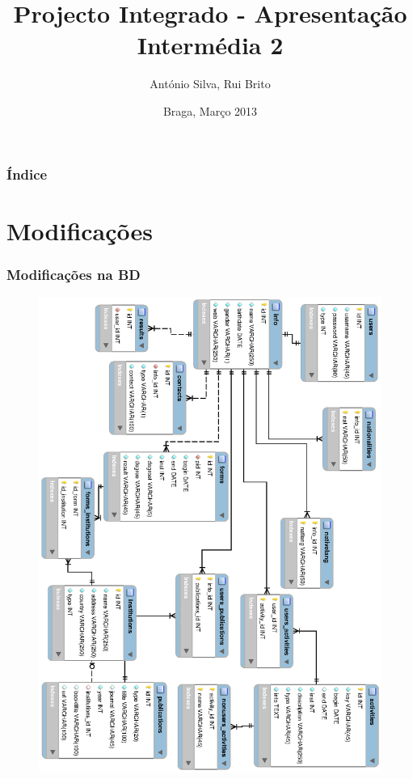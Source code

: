\documentclass{beamer}
\title{Projecto Integrado - Apresentação Intermédia 2}
\author{António Silva, Rui Brito}
\institute[pg22820, pg22781]{
	Universidade do Minho
}
\date{Braga, Março 2013}
\begin{document}

\maketitle%

\begin{frame}
	\frametitle{Índice}
	\tableofcontents
\end{frame}

\section{Modificações}
\begin{frame}
	\frametitle{Modificações na BD}

	\begin{figure}[!htp]
		\includegraphics[totalheight=1.2\textheight,angle=90]{../bd2.eps}		
		\end{figure}

\end{frame}
\end{document}
